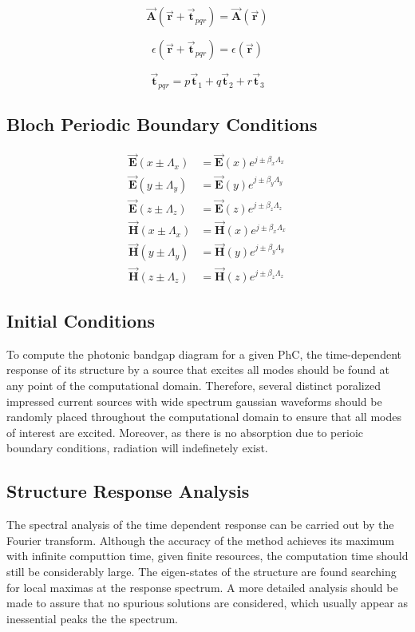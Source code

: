 \documentclass[journal,transmag]{IEEEtran}
\begin{document}
\begin{equation}
	\vec{\bm{A}}(\vec{\bm{r}} + \vec{\bm{t}}_{pqr}) =
	\vec{\bm{A}}(\vec{\bm{r}})
\end{equation}

\begin{equation}
	\epsilon(\vec{\bm{r}} + \vec{\bm{t}}_{pqr}) =
	\epsilon(\vec{\bm{r}})
\end{equation}


\begin{equation}
	\vec{\bm{t}}_{pqr} = p\vec{\bm{t}}_{1} + q\vec{\bm{t}}_{2}+ r\vec{\bm{t}}_{3}
\end{equation}

\the\textwidth
\the\columnwidth{}

\subsection{Bloch Periodic Boundary Conditions}
\begin{align}
	\vec{\bm{E}}(x \pm \Lambda_{x}) & =
	\vec{\bm{E}}(x) e^{j\pm \beta_{x} \Lambda_{x}} \\
	\vec{\bm{E}}(y \pm \Lambda_{y}) & =
	\vec{\bm{E}}(y) e^{j\pm \beta_{y} \Lambda_{y}} \\
	\vec{\bm{E}}(z \pm \Lambda_{z}) & =
	\vec{\bm{E}}(z) e^{j\pm \beta_{z} \Lambda_{z}} \\
	\vec{\bm{H}}(x \pm \Lambda_{x}) & =
	\vec{\bm{H}}(x) e^{j\pm \beta_{x} \Lambda_{x}} \\
	\vec{\bm{H}}(y \pm \Lambda_{y}) & =
	\vec{\bm{H}}(y) e^{j\pm \beta_{y} \Lambda_{y}} \\
	\vec{\bm{H}}(z \pm \Lambda_{z}) & =
	\vec{\bm{H}}(z) e^{j\pm \beta_{z} \Lambda_{z}}
\end{align}

\subsection{Initial Conditions}
To compute the photonic bandgap diagram for a given PhC, the time-dependent response of its structure by a source that excites all modes should be found at any point of the computational domain. Therefore, several distinct poralized impressed current sources with wide spectrum gaussian waveforms should be randomly placed throughout the computational domain to ensure that all modes of interest are excited. Moreover, as there is no absorption due to perioic boundary conditions, radiation will indefinetely exist.

\subsection{Structure Response Analysis}
The spectral analysis of the time dependent response can be carried out by the Fourier transform. Although the accuracy of the method achieves its maximum with infinite computtion time, given finite resources, the computation time should still be considerably large. The eigen-states of the structure are found searching for local maximas at the response spectrum. A more detailed analysis should be made to assure that no spurious solutions are considered, which usually appear as inessential peaks the the spectrum.
\end{document}
